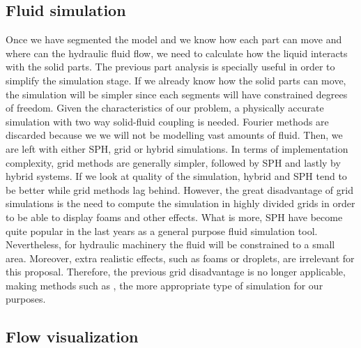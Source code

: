 
\subsection{Fluid simulation}

Once we have segmented the model and we know how each part can move and where can the hydraulic fluid flow, we need to calculate how the liquid interacts with the solid parts.
The previous part analysis is specially useful in order to simplify the simulation stage.
If we already know how the solid parts can move, the simulation will be simpler since each segments will have constrained degrees of freedom.
Given the characteristics of our problem, a physically accurate simulation with two way solid-fluid coupling is needed.
Fourier methods are discarded because we we will not be modelling vast amounts of fluid.
Then, we are left with either SPH, grid or hybrid simulations.
In terms of implementation complexity, grid methods are generally simpler, followed by SPH and lastly by hybrid systems.
If we look at quality of the simulation, hybrid and SPH tend to be better while grid methods lag behind.
However, the great disadvantage of grid simulations is the need to compute the simulation in highly divided grids in order to be able to display foams and other effects.
What is more, SPH have become quite popular in the last years as a general purpose fluid simulation tool.
Nevertheless, for hydraulic machinery the fluid will be constrained to a small area.
Moreover, extra realistic effects, such as foams or droplets, are irrelevant for this proposal.
Therefore, the previous grid disadvantage is no longer applicable, making methods such as \cite{Carlson2004}, the more appropriate type of simulation for our purposes.


\subsection{Flow visualization}

